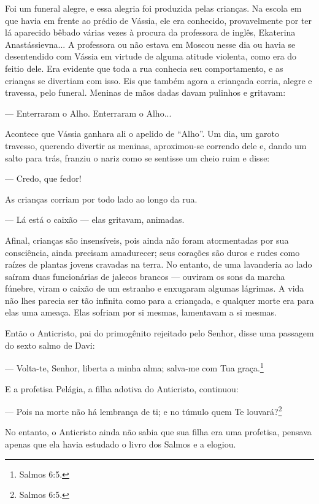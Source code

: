 Foi um funeral alegre, e essa alegria foi produzida pelas crianças. Na
escola em que havia em frente ao prédio de Vássia, ele era conhecido,
provavelmente por ter lá aparecido bêbado várias vezes à procura da
professora de inglês, Ekaterina Anastássievna... A professora ou não
estava em Moscou nesse dia ou havia se desentendido com Vássia em
virtude de alguma atitude violenta, como era do feitio dele. Era
evidente que toda a rua conhecia seu comportamento, e as crianças se
divertiam com isso. Eis que também agora a criançada corria, alegre e
travessa, pelo funeral. Meninas de mãos dadas davam pulinhos e gritavam:

--- Enterraram o Alho. Enterraram o Alho...

Acontece que Vássia ganhara ali o apelido de ``Alho''. Um dia, um garoto
travesso, querendo divertir as meninas, aproximou-se correndo dele e,
dando um salto para trás, franziu o nariz como se sentisse um cheio ruim
e disse:

--- Credo, que fedor!

As crianças corriam por todo lado ao longo da rua.

--- Lá está o caixão --- elas gritavam, animadas.

Afinal, crianças são insensíveis, pois ainda não foram atormentadas por
sua consciência, ainda precisam amadurecer; seus corações são duros e
rudes como raízes de plantas jovens cravadas na terra. No entanto, de
uma lavanderia ao lado saíram duas funcionárias de jalecos brancos ---
ouviram os sons da marcha fúnebre, viram o caixão de um estranho e
enxugaram algumas lágrimas. A vida não lhes parecia ser tão infinita
como para a criançada, e qualquer morte era para elas uma ameaça. Elas
sofriam por si mesmas, lamentavam a si mesmas.

Então o Anticristo, pai do primogênito rejeitado pelo Senhor, disse uma
passagem do sexto salmo de Davi:

--- Volta-te, Senhor, liberta a minha alma; salva-me com Tua
graça.\footnote{Salmos 6:5.}

E a profetisa Pelágia, a filha adotiva do Anticristo, continuou:

--- Pois na morte não há lembrança de ti; e no túmulo quem Te
louvará?\footnote{Salmos 6:5.}

No entanto, o Anticristo ainda não sabia que sua filha era uma
profetisa, pensava apenas que ela havia estudado o livro dos Salmos e a
elogiou.

